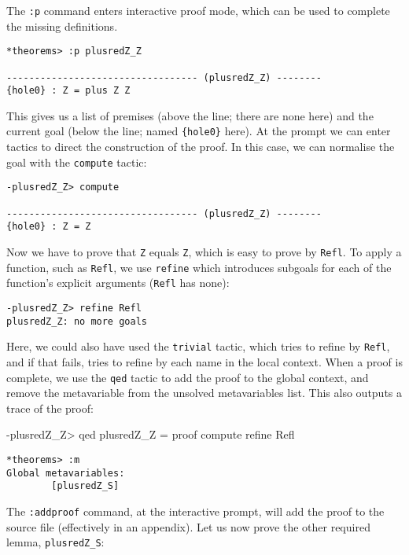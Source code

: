 \noindent
The \texttt{:p} command enters interactive proof mode, which can be used to complete the missing definitions.

\begin{lstlisting}[style=stdout]
*theorems> :p plusredZ_Z

---------------------------------- (plusredZ_Z) --------
{hole0} : Z = plus Z Z
\end{lstlisting}

\noindent
This gives us a list of premises (above the line; there are none here) and the current goal (below the line; named \texttt{\{hole0\}} here).
At the prompt we can enter tactics to direct the construction of the proof.
In this case, we can normalise the goal with the \texttt{compute} tactic:

\begin{lstlisting}[style=stdout]
-plusredZ_Z> compute

---------------------------------- (plusredZ_Z) --------
{hole0} : Z = Z
\end{lstlisting}

\noindent
Now we have to prove that \texttt{Z} equals \texttt{Z}, which is easy to prove by \texttt{Refl}.
To apply a function, such as \texttt{Refl}, we use \texttt{refine} which introduces subgoals for each of the function's explicit arguments (\texttt{Refl} has none):

\begin{lstlisting}[style=stdout]
-plusredZ_Z> refine Refl
plusredZ_Z: no more goals
\end{lstlisting}

\noindent
Here, we could also have used the \texttt{trivial} tactic, which tries to refine by \texttt{Refl}, and if that fails, tries to refine by each name in the local context.
When a proof is complete, we use the \texttt{qed} tactic to add the proof to the global context, and remove the metavariable from the unsolved metavariables list.
This also outputs a trace of the proof:

\begin{code}
-plusredZ_Z> qed
plusredZ_Z = proof
    compute
    refine Refl
\end{code}

\begin{lstlisting}[style=stdout]
*theorems> :m
Global metavariables:
        [plusredZ_S]
\end{lstlisting}

\noindent
The \texttt{:addproof} command, at the interactive prompt, will add the proof to the source file (effectively in an appendix).
Let us now prove the other required lemma, \texttt{plusredZ\_S}:

